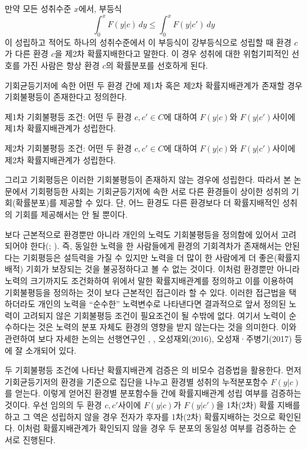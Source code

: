 만약 모든 성취수준 $x$에서, 부등식
\begin{equation}
   \int_{0}^{x} F(y | c)\,dy \leq \int_{0}^{x} F(y | c')\,dy
    \label{eq:sdom}
\end{equation}
이 성립하고 적어도 하나의 성취수준에서 이 부등식이 강부등식으로 성립할 때 환경 $c$가 다른 환경 $c$을 제2차 확률지배한다고 말한다.
이 경우 성취에 대한 위험기피적인 선호를 가진 사람은 항상 환경 $c$의 확률분포를 선호하게 된다.

기회균등기저에 속한 어떤 두 환경 간에 제1차 혹은 제2차 확률지배관계가 존재할 경우 기회불평등이 존재한다고 정의한다. 

제1차 기회불평등 조건: 어떤 두 환경 $c,c' \in C$에 대하여 $F(y | c)$와 $F(y | c')$사이에 제1차 확률지배관계가 성립한다.

제2차 기회불평등 조건: 어떤 두 환경 $c,c' \in C$에 대하여 $F(y | c)$와 $F(y | c')$사이에 제2차 확률지배관계가 성립한다.

그리고 기회평등은 이러한 기회불평등이 존재하지 않는 경우에 성립한다.
따라서 본 논문에서 기회평등한 사회는 기회균등기저에 속한 서로 다른 환경들이 상이한 성취의 기회(확률분포)를 제공할 수 있다.
단, 어느 환경도 다른 환경보다 더 확률지배적인 성취의 기회를 제공해서는 안 될 뿐이다.
 
보다 근본적으로 환경뿐만 아니라 개인의 노력도 기회불평등을 정의함에 있어서 고려되어야 한다(\citet{Roemer98}; \citet{letl08, letl09}).
즉, 동일한 노력을  한 사람들에게 환경의 기회격차가 존재해서는 안된다는 기회평등은 설득력을 가질 수 있지만 노력을 더 많이 한 사람에게 더 좋은(확률지배적) 기회가 보장되는 것을 불공정하다고 볼 수 없는 것이다.
이처럼 환경뿐만 아니라 노력의 크기까지도 조건화하여 위에서 말한 확률지배관계를 정의하고 이를 이용하여 기회불평등을 정의하는 것이 보다 근본적인 접근이라 할 수 있다.
이러한 접근법을 택하더라도 개인의 노력을 ``순수한'' 노력변수로 나타낸다면 결과적으로 앞서 정의된 노력이 고려되지 않은 기회불평등 조건이 필요조건이 될 수밖에 없다.
여기서 노력이 순수하다는 것은 노력의 분포 자체도 환경의 영향을 받지 않는다는 것을 의미한다.
이와 관련하여 보다 자세한 논의는 선행연구인 \citet{Roemer98}, \citet{letl08, letl09}, 오성재외(2016), 오성재·주병기(2017) 등에 잘 소개되어 있다.

두 기회불평등 조건에 나타난 확률지배관계 검증은 \citet{dnd00}의 비모수 검증법을 활용한다.
먼저 기회균등기저의 환경을 기준으로 집단을 나누고 환경별 성취의 누적분포함수 $F(y | c)$를 얻는다.
이렇게 얻어진 환경별 분포함수들 간에 확률지배관계 성립 여부를 검증하는 것이다.
우선 임의의 두 환경 $c,c'$사이에 $F(y | c)$가 $F(y | c')$을 1차(2차) 확률 지배를 하고 그 역은 성립하지 않을 경우 전자가 후자를 1차(2차) 확률지배하는 것으로 확인된다.
이처럼 확률지배관계가 확인되지 않을 경우 두 분포의 동일성 여부를 검증하는 순서로 진행된다.

